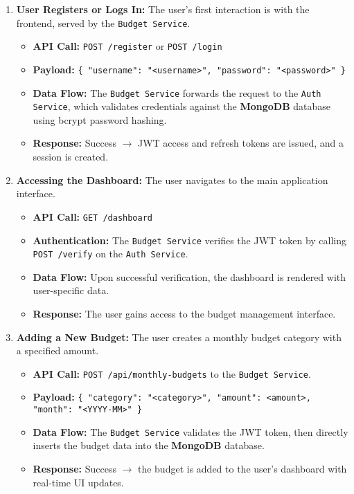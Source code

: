 \documentclass[conference]{IEEEtran}
\begin{document}
\begin{enumerate}
  \item \textbf{User Registers or Logs In:}
  The user's first interaction is with the frontend, served by the \texttt{Budget Service}.
  \begin{itemize}
    \item \textbf{API Call:} \texttt{POST /register} or \texttt{POST /login}
    \item \textbf{Payload:} \texttt{\{ "username": "<username>", "password": "<password>" \}}
    \item \textbf{Data Flow:} The \texttt{Budget Service} forwards the request to the \texttt{Auth Service}, which validates credentials against the \textbf{MongoDB} database using bcrypt password hashing.
    \item \textbf{Response:} Success $\rightarrow$ JWT access and refresh tokens are issued, and a session is created.
  \end{itemize}

  \item \textbf{Accessing the Dashboard:}
  The user navigates to the main application interface.
  \begin{itemize}
    \item \textbf{API Call:} \texttt{GET /dashboard}
    \item \textbf{Authentication:} The \texttt{Budget Service} verifies the JWT token by calling \texttt{POST /verify} on the \texttt{Auth Service}.
    \item \textbf{Data Flow:} Upon successful verification, the dashboard is rendered with user-specific data.
    \item \textbf{Response:} The user gains access to the budget management interface.
  \end{itemize}

  \item \textbf{Adding a New Budget:}
  The user creates a monthly budget category with a specified amount.
  \begin{itemize}
    \item \textbf{API Call:} \texttt{POST /api/monthly-budgets} to the \texttt{Budget Service}.
    \item \textbf{Payload:} \texttt{\{ "category": "<category>", "amount": <amount>, "month": "<YYYY-MM>" \}}
    \item \textbf{Data Flow:} The \texttt{Budget Service} validates the JWT token, then directly inserts the budget data into the \textbf{MongoDB} database.
    \item \textbf{Response:} Success $\rightarrow$ the budget is added to the user's dashboard with real-time UI updates.
  \end{itemize}


\end{enumerate}
\end{document}
